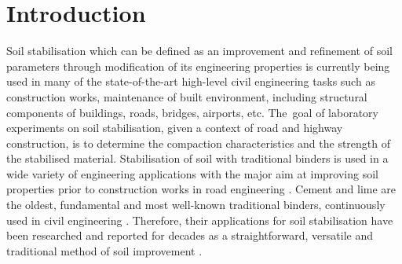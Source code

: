 \documentclass[materials,article,accept,pdftex,moreauthors]{Definitions/mdpi}
\begin{document}
\section{Introduction}

Soil stabilisation which can be defined as an improvement and refinement of soil parameters through modification of its engineering properties is currently being used in many of the state-of-the-art high-level civil engineering tasks such as construction works, maintenance of built environment, including structural components of buildings, roads, bridges, airports, etc. The~goal of laboratory experiments on soil stabilisation, given a context of road and highway construction, is to determine the compaction characteristics and the strength of the stabilised material. Stabilisation of soil with traditional binders is used in a wide variety of engineering applications with the major aim at improving soil properties prior to construction works in road engineering \citep{Park,Glossop,Kallenetal2016,Abdullah,Kallenetal2014,Sudhakar,Nordmark}. Cement and lime are the oldest, fundamental and most well-known traditional binders, continuously used in civil engineering \citep{Mitchell,Chen,Hilt,Kaniraj}. Therefore, their applications for soil stabilisation have been researched and reported for decades as a straightforward, versatile and traditional method of soil improvement \citep{Markwick,Abbey,Aldaood,Bell,Dahlinetal1999}. 
\end{document}
